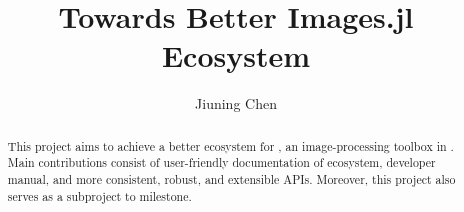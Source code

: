 \documentclass[12pt, a4paper]{article}
\title{\huge Towards Better Images.jl Ecosystem}
\author{Jiuning Chen\mailto{johnnychen94@hotmail.com}}
\affil{Github: \href{https://github.com/johnnychen94}{Johnnychen94} \quad Slack: Johnny Chen\\
Mentors: \zygmunt, \julio, \timholy}
\date{}
\begin{document}
\maketitle

\begin{abstract}
    This project aims to achieve a better ecosystem for \href{https://juliaimages.org/latest/}{\images}, an image-processing toolbox in \href{https://julialang.org/}{\langjulia}. Main contributions consist of user-friendly documentation of \images{} ecosystem, developer manual, and more consistent, robust, and extensible APIs. Moreover, this project also serves as a subproject to \images{}  milestone.
\end{abstract}


\renewcommand\contentsname{Table of Contents}
\tableofcontents

\newpage






\end{document}
